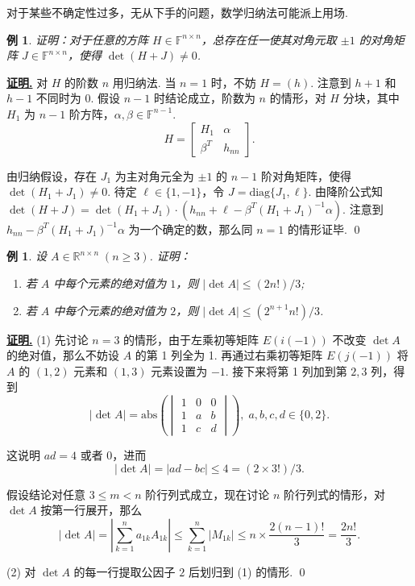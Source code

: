 \documentclass[10pt,openany]{article}
\theoremstyle{thmstyle} %
\theoremstyle{defstyle} %
\theoremstyle{prostyle} %
\theoremstyle{exastyle}
\newtheorem{example}[theorem]{例}
\theoremstyle{remstyle}
\renewenvironment{proof}[1][证明]{\par\underline{\textbf{#1.}} \;\fangsong}{\qed\par}
\newcommand{\F}{\mathbb{F}}
\newcommand{\R}{\mathbb{R}}
\newcommand{\n}{^{n \times n}}
\newcommand{\diag}{\mathrm{diag}}
\begin{document}
对于某些不确定性过多，无从下手的问题，数学归纳法可能派上用场.

\begin{example}
	证明：对于任意的方阵 \( H \in \F\n \)，总存在任一使其对角元取 \( \pm 1 \) 的对角矩阵 \( J \in \F\n \)，使得 \(\det(H + J) \neq 0 \).
\end{example}

\begin{proof}
	对 \( H \) 的阶数 \( n \) 用归纳法. 当 \( n=1 \) 时，不妨 \( H=(h) \). 注意到 \( h+1 \) 和 \( h-1 \) 不同时为 0. 假设 \( n-1 \) 时结论成立，阶数为 \( n \) 的情形，对 \( H \) 分块，其中 \( H_1 \) 为 \( n-1 \) 阶方阵，\( \alpha,\beta \in \mathbb{F}^{n-1} \).
	\[ H=\begin{bmatrix}
		H_1 & \alpha \\ \beta^T & h_{nn}
	\end{bmatrix}. \] 
	
	由归纳假设，存在 \( J_1 \) 为主对角元全为 \( \pm 1 \) 的 \( n-1 \) 阶对角矩阵，使得 \( \det(H_1+J_1) \neq 0 \). 待定 \( \ell \in \{1,-1\} \)，令 \( J=\diag \{ J_1, \ell\} \). 由降阶公式知 \( \det(H+J)=\det(H_1+J_1) \cdot (h_{nn}+\ell-\beta^T(H_1+J_1)^{-1}\alpha) \). 注意到 \( h_{nn}-\beta^T(H_1+J_1)^{-1}\alpha \) 为一个确定的数，那么同 \( n=1 \) 的情形证毕.
\end{proof}

\begin{example} \label{4.1.9}
	设 \( A \in \R\n \; (n \geq 3) \). 证明：
	\begin{enumerate}[(1)]
		\item 若 \( A \) 中每个元素的绝对值为 \( 1 \)，则 \( |\det A| \leq (2n!)/3 \);
		\item 若 \( A \) 中每个元素的绝对值为 \( 2 \)，则 \( |\det A| \leq (2^{n+1}n!)/3 \).
	\end{enumerate}
	
\end{example}

\begin{proof}
	(1) 先讨论 \( n=3 \) 的情形，由于左乘初等矩阵 \( E(i(-1)) \) 不改变 \( \det A \) 的绝对值，那么不妨设 \( A \) 的第 1 列全为 1. 再通过右乘初等矩阵 \( E(j(-1)) \) 将 \( A \) 的 \( (1,2) \) 元素和 \( (1,3) \) 元素设置为 \( -1 \). 接下来将第 1 列加到第 \( 2,3 \) 列，得到
	\[ |\det A|= \text{abs} \left( \begin{vmatrix}
		1 & 0 & 0 \\
		1 & a & b \\
		1 & c & d
	\end{vmatrix} \right), \; a,b,c,d \in \{0,2\}. \]
	
	这说明 \( ad=4 \) 或者 0，进而
	\[ |\det A| =|ad-bc| \leq 4=(2 \times 3!)/3. \]
	
	假设结论对任意 \( 3 \leq m<n \) 阶行列式成立，现在讨论 \( n \) 阶行列式的情形，对 \( \det A \) 按第一行展开，那么
	\[ |\det A|= \left| \sum_{k=1}^{n} a_{1k}A_{1k} \right| \leq \sum_{k=1}^{n} |M_{1k}| \leq n \times \frac{2(n-1)!}{3}= \frac{2n!}{3}. \]
	
	(2) 对 \( \det A \) 的每一行提取公因子 \( 2 \) 后划归到 (1) 的情形.
\end{proof}
\end{document}
